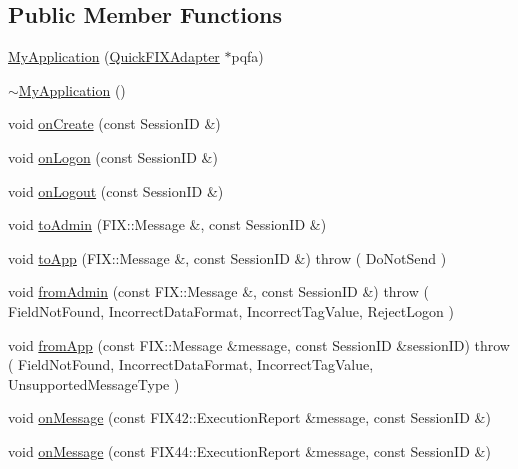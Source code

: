 \subsection*{Public Member Functions}
\begin{DoxyCompactItemize}
\item 
\hyperlink{classMetal_1_1QuickFIX_1_1MyApplication_ac015be7d9bb1677acda6fa464ce0f8ea}{My\+Application} (\hyperlink{classMetal_1_1QuickFIX_1_1QuickFIXAdapter}{Quick\+F\+I\+X\+Adapter} $\ast$pqfa)
\item 
\hyperlink{classMetal_1_1QuickFIX_1_1MyApplication_a1863c717971ba7a4d89dc50ee369abde}{$\sim$\+My\+Application} ()
\item 
void \hyperlink{classMetal_1_1QuickFIX_1_1MyApplication_a3f94210c4e0cbe060de70f7a875195c0}{on\+Create} (const Session\+I\+D \&)
\item 
void \hyperlink{classMetal_1_1QuickFIX_1_1MyApplication_a8dd2c71b6ec276e4f3da25d3b58710b8}{on\+Logon} (const Session\+I\+D \&)
\item 
void \hyperlink{classMetal_1_1QuickFIX_1_1MyApplication_ab5519b36c6fa527fd482bfb6864bad44}{on\+Logout} (const Session\+I\+D \&)
\item 
void \hyperlink{classMetal_1_1QuickFIX_1_1MyApplication_aa884521d47f50ff8c66c4ccd1409e1d6}{to\+Admin} (F\+I\+X\+::\+Message \&, const Session\+I\+D \&)
\item 
void \hyperlink{classMetal_1_1QuickFIX_1_1MyApplication_af32204a063c0a11009652626c86b24d0}{to\+App} (F\+I\+X\+::\+Message \&, const Session\+I\+D \&)  throw ( Do\+Not\+Send )
\item 
void \hyperlink{classMetal_1_1QuickFIX_1_1MyApplication_a4805e0aa8bc992043a2e3a0a4f818221}{from\+Admin} (const F\+I\+X\+::\+Message \&, const Session\+I\+D \&)  throw ( Field\+Not\+Found, Incorrect\+Data\+Format, Incorrect\+Tag\+Value, Reject\+Logon )
\item 
void \hyperlink{classMetal_1_1QuickFIX_1_1MyApplication_aca5ad6dbc249cb4093988887224598a6}{from\+App} (const F\+I\+X\+::\+Message \&message, const Session\+I\+D \&session\+I\+D)  throw ( Field\+Not\+Found, Incorrect\+Data\+Format, Incorrect\+Tag\+Value, Unsupported\+Message\+Type )
\item 
void \hyperlink{classMetal_1_1QuickFIX_1_1MyApplication_a6d513e282a19bbccd0719c39ca5c5dcf}{on\+Message} (const F\+I\+X42\+::\+Execution\+Report \&message, const Session\+I\+D \&)
\item 
void \hyperlink{classMetal_1_1QuickFIX_1_1MyApplication_a0bdc162c886f9aa87b481877d990a084}{on\+Message} (const F\+I\+X44\+::\+Execution\+Report \&message, const Session\+I\+D \&)
\end{DoxyCompactItemize}


